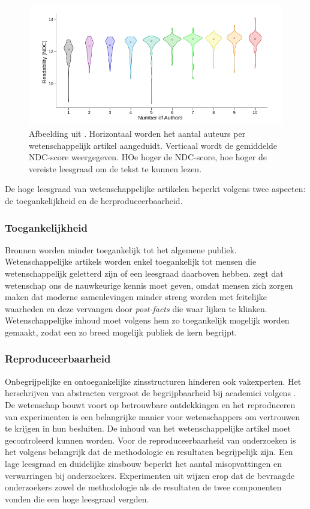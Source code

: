\begin{figure}[H]
	\includegraphics[width=\linewidth]{img/ndc-number-of-authors.png}
	\caption{Afbeelding uit \textcite{PlavenSigray2017}. Horizontaal worden het aantal auteurs per wetenschappelijk artikel aangeduidt. Verticaal wordt de gemiddelde NDC-score weergegeven. HOe hoger de NDC-score, hoe hoger de vereiste leesgraad om de tekst te kunnen lezen.}
\end{figure}

De hoge leesgraad van wetenschappelijke artikelen beperkt volgens \textcite{PlavenSigray2017} twee aspecten: de toegankelijkheid en de herproduceerbaarheid.

\subsubsection{Toegankelijkheid}

Bronnen worden minder toegankelijk tot het algemene publiek. Wetenschappelijke artikels worden enkel toegankelijk tot mensen die wetenschappelijk geletterd zijn of een leesgraad daarboven hebben. \textcite{Ennals2010} zegt dat wetenschap ons de nauwkeurige kennis moet geven, omdat mensen zich zorgen maken dat moderne samenlevingen minder streng worden met feitelijke waarheden en deze vervangen door \textit{post-facts} die waar lijken te klinken. Wetenschappelijke inhoud moet volgens hem zo toegankelijk mogelijk worden gemaakt, zodat een zo breed mogelijk publiek de kern begrijpt.

\subsubsection{Reproduceerbaarheid}

Onbegrijpelijke en ontoegankelijke zinsstructuren hinderen ook vakexperten. Het herschrijven van abstracten vergroot de begrijpbaarheid bij academici volgens \textcite{Hartley1999, Snow2010}. De wetenschap bouwt voort op betrouwbare ontdekkingen en het reproduceren van experimenten is een belangrijke manier voor wetenschappers om vertrouwen te krijgen in hun besluiten. De inhoud van het wetenschappelijke artikel moet gecontroleerd kunnen worden. Voor de reproduceerbaarheid van onderzoeken is het volgens \textcite{McNutt2014} belangrijk dat de methodologie en resultaten begrijpelijk zijn. Een lage leesgraad en duidelijke zinsbouw beperkt het aantal misopvattingen en verwarringen bij onderzoekers. Experimenten uit \textcite{Hubbard2017} wijzen erop dat de bevraagde onderzoekers zowel de methodologie als de resultaten de twee componenten vonden die een hoge leesgraad vergden. 

